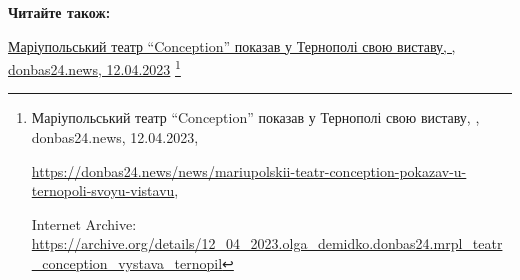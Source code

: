  
 
 
 
 

\def\pubIA{https://archive.org/details/12_04_2023.olga_demidko.donbas24.mrpl_teatr_conception_vystava_ternopil}
\def\pubTitle{Маріупольський театр \enquote{Conception} показав у Тернополі свою виставу}
\def\pubDate{12.04.2023}
\def\pubOrigin{https://donbas24.news/news/mariupolskii-teatr-conception-pokazav-u-ternopoli-svoyu-vistavu}
\def\pubAuthor{\pubAuthorDemidko}
\def\pubSite{donbas24.news}

\textbf{Читайте також:}\par\href{\pubIA}{%
\pubTitle, \pubAuthor, \pubSite, \pubDate}%
\footnote{\pubTitle, \pubAuthor, \pubSite, \pubDate, \par\url{\pubOrigin}, \par Internet Archive: \url{\pubIA}}
